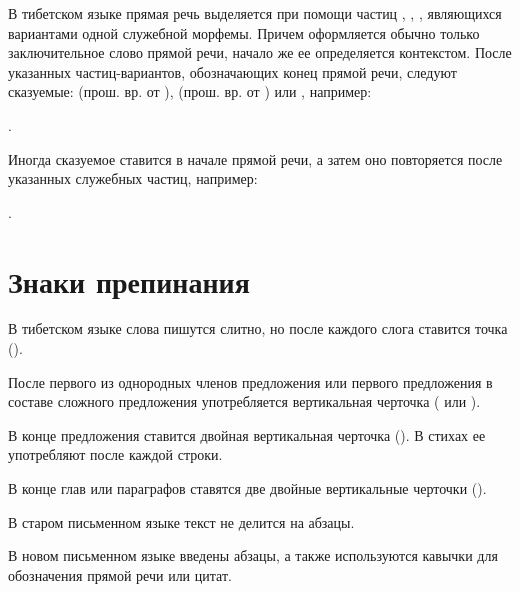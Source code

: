 В тибетском языке прямая речь выделяется при помощи частиц	, , , являющихся вариантами одной служебной морфемы. Причем оформляется обычно только заключительное слово прямой речи, начало же ее определяется контекстом. После указанных частиц-вариантов, обозначающих конец прямой речи, следуют сказуемые:
 (прош. вр. от ),
 (прош. вр. от ) или
, например:
\begin{prfsample}
	\item {}.
\end{prfsample}

Иногда сказуемое  ставится в начале прямой речи, а затем оно повторяется после указанных служебных частиц, например:
\begin{prfsample}
	\item {}.
\end{prfsample}

\section{Знаки препинания}

В тибетском языке слова пишутся слитно, но после каждого слога ставится точка ().

После первого из однородных членов предложения или первого предложения в составе сложного предложения употребляется вертикальная черточка ( или
).

В конце предложения ставится двойная вертикальная черточка (). В стихах ее употребляют после каждой строки.

В конце глав или параграфов ставятся две двойные вертикальные черточки ().

В старом письменном языке текст не делится на абзацы.

В новом письменном языке введены абзацы, а также используются кавычки для обозначения прямой речи или цитат.